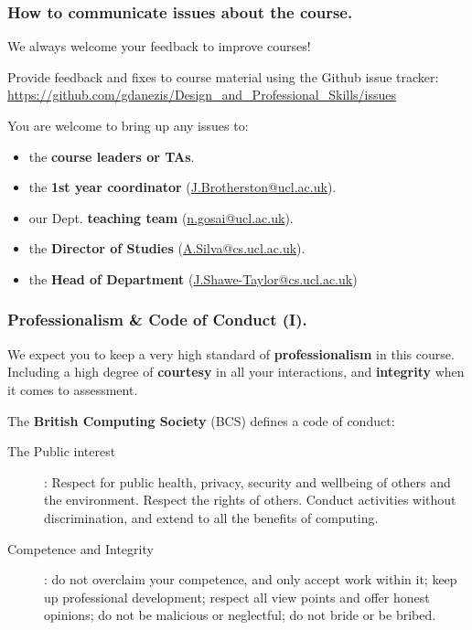 \documentclass{beamer} %
\newcommand\emc[1]{\textcolor{brightblue}{\textbf{#1}}}
\begin{document}
\begin{frame}
\frametitle{How to communicate issues about the course.}

We always welcome your feedback to improve courses!

\vspace{3mm}
Provide feedback and fixes to course material using the Github issue tracker:
\url{https://github.com/gdanezis/Design_and_Professional_Skills/issues}

\vspace{3mm}
You are welcome to bring up any issues to:
\begin{itemize}
	\item the \emc{course leaders or TAs}.
	\item the \emc{1st year coordinator} (\url{J.Brotherston@ucl.ac.uk}).
	\item our Dept. \emc{teaching team} (\url{n.gosai@ucl.ac.uk}).
	\item the \emc{Director of Studies} (\url{A.Silva@cs.ucl.ac.uk}).
	\item the \emc{Head of Department} (\url{J.Shawe-Taylor@cs.ucl.ac.uk})
\end{itemize}

\end{frame}

\begin{frame}
\frametitle{Professionalism \& Code of Conduct (I).}

We expect you to keep a very high standard of \emc{professionalism} in this course. Including a high degree of \emc{courtesy} in all your interactions, and \emc{integrity} when it comes to assessment.

\vspace{3mm}
The \emc{British Computing Society} (BCS) defines a code of conduct:
\begin{description}
	\item[The Public interest]: Respect for public health, privacy, security and wellbeing of others and the environment. Respect the rights of others. Conduct activities without discrimination, and extend to all the benefits of computing.
	\item[Competence and Integrity]: do not overclaim your competence, and only accept work within it; keep up professional development; respect all view points and offer honest opinions; do not be malicious or neglectful; do not bride or be bribed.
\end{description}

\end{frame}
\end{document}
